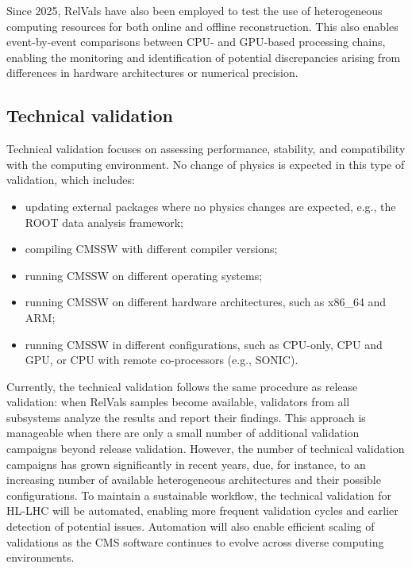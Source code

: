 Since 2025, \glspl{RelVal} have also been employed to test the use of heterogeneous computing resources for both online and offline reconstruction. This also enables event-by-event comparisons between \gls{CPU}- and \gls{GPU}-based processing chains, enabling the monitoring and identification of potential discrepancies arising from differences in hardware architectures or numerical precision.

\subsection{Technical validation}
Technical validation focuses on assessing performance, stability, and compatibility with the computing environment. No change of physics is expected in this type of validation, which includes:
\begin{itemize}
    \item updating external packages where no physics changes are expected, e.g., the \textsc{ROOT} data analysis framework;
	\item compiling \gls{CMSSW} with different compiler versions;
    \item running \gls{CMSSW} on different operating systems;
    \item running \gls{CMSSW} on different hardware architectures, such as x86\_64 and \gls{ARM};
    \item running \gls{CMSSW} in different configurations, such as \gls{CPU}-only, \gls{CPU} and \gls{GPU}, or \gls{CPU} with remote co-processors (e.g., \gls{SONIC}).
\end{itemize}

Currently, the technical validation follows the same procedure as release validation: when \glspl{RelVal} samples become available, validators from all subsystems analyze the results and report their findings. This approach is manageable when there are only a small number of additional validation campaigns beyond release validation.
However, the number of technical validation campaigns has grown significantly in recent years, due, for instance, to an increasing number of available heterogeneous architectures and their possible configurations. To maintain a sustainable workflow, the technical validation for \gls{HL-LHC} will be automated, enabling more frequent validation cycles and earlier detection of potential issues. Automation will also enable efficient scaling of validations as the CMS software continues to evolve across diverse computing environments.

